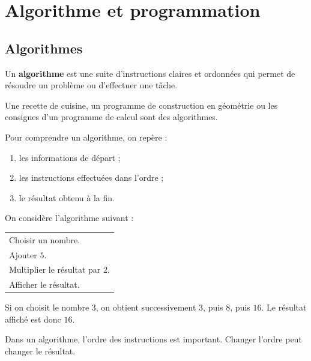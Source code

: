\documentclass[a4paper,10pt]{report}
\begin{document}
\newpage
\setcounter{chapter}{18}
\chapter{Algorithme et programmation}

\section{Algorithmes}

\begin{defn}
Un \textbf{algorithme} est une suite d'instructions claires et ordonnées qui permet de résoudre un problème ou d'effectuer une tâche.
\end{defn}

\begin{exemple}
Une recette de cuisine, un programme de construction en géométrie ou les consignes d'un programme de calcul sont des algorithmes.
\end{exemple}

\begin{meth}
Pour comprendre un algorithme, on repère :
\begin{enumerate}
\item les informations de départ ;
\item les instructions effectuées dans l'ordre ;
\item le résultat obtenu à la fin.
\end{enumerate}
\end{meth}

\begin{exemple}
On considère l'algorithme suivant :
\begin{center}
\begin{tabular}{|p{9cm}|}
\hline
Choisir un nombre.\\
Ajouter $5$.\\
Multiplier le résultat par $2$.\\
Afficher le résultat.\\
\hline
\end{tabular}
\end{center}

Si on choisit le nombre $3$, on obtient successivement $3$, puis $8$, puis $16$. Le résultat affiché est donc $16$.
\end{exemple}

\begin{rem}
Dans un algorithme, l'ordre des instructions est important. Changer l'ordre peut changer le résultat.
\end{rem}
\end{document}
